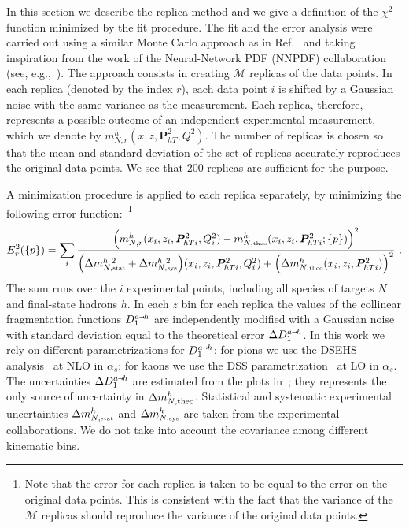 \documentclass[aps,preprintnumbers,showpacs,nofootinbib,superscriptaddress,floatfix]{revtex4}
\newcommand{\smarrow}{\mbox{\raisebox{-4.5pt}[0pt][0pt]{$\hspace{-1pt} 
		\vec{\phantom{v}}$}}}
\newcommand{\Tperp}{T}
\begin{document}
In this section we describe the replica method and we give a definition of the $\chi^2$ function minimized by the fit procedure.
The fit and the error analysis were carried out using a similar Monte Carlo approach as in Ref.~\cite{Bacchetta:2012ty,Signori:2013mda,Radici:2015mwa} and taking
inspiration from the work of the Neural-Network PDF (NNPDF) collaboration (see, e.g.,~\cite{Forte:2002fg,Ball:2008by,Ball:2010de}). 
The approach consists in creating $\mathcal{M}$ replicas of the data points. In each replica (denoted by the index $r$), each data point $i$ is shifted by a Gaussian noise with the same variance as the measurement. 
Each replica, therefore, represents a possible outcome of an independent experimental measurement, which we denote by $m_{N, r}^{h}(x, z, \bm{P}_{h\Tperp}^2, Q^2)$. 
The number of replicas is chosen so that the mean and standard deviation of the set of replicas accurately reproduces the original data points. We see that 200 replicas are sufficient for the purpose.

A minimization procedure is applied to each replica separately, by minimizing the following error function:~\footnote{Note that the error for each replica is taken to be equal to the error on the original data points. This is consistent with the fact that the variance of the $\mathcal{M}$ replicas should reproduce the variance of the original data points.}  
\begin{equation}
E_r^2(\{p\})=\sum_{i} 
\frac{\Bigl(m_{N, r}^{h}(x_i, z_i, \bm{P}_{h\Tperp i}^2, Q_i^2) - m_{N,  \mbox{\tiny theo}}^{h}(x_i, z_i, \bm{P}_{h\Tperp i}^2; \{p\})\Bigr)^2}
        {\Bigl( \Delta m_{N, \mbox{\tiny stat}}^{h\ 2} + \Delta m_{N, \mbox{\tiny sys}}^{h\ 2} \Bigr)(x_i, z_i, \bm{P}_{h\Tperp i}^2, Q^2_i) +\Bigl(\Delta m_{N, \mbox{\tiny theo}}^{h}(x_i, z_i, \bm{P}_{h\Tperp i}^2) \Bigr)^2}\  . 
\label{e:MC_chi2}
\end{equation}
The sum runs over the $i$ experimental points, including all species of targets $N$ and final-state hadrons $h$. 
In each $z$ bin for each replica the values of the collinear fragmentation functions $D_1^{a \smarrow h}$ are independently modified with a Gaussian noise with standard deviation equal to the theoretical error $\Delta D_1^{a\smarrow h}$. 
In this work we rely on different parametrizations for $D_1^{a \smarrow h}$: for pions we use the DSEHS analysis~\cite{deFlorian:2014xna} at NLO in $\alpha_s$; for kaons we use the DSS parametrization~\cite{deFlorian:2007aj} at LO in $\alpha_s$. 
The uncertainties $\Delta D_1^{a\smarrow h}$ are estimated from the plots in~\cite{Epele:2012vg}; they represents the only source of uncertainty in $\Delta m_{N,  {\rm theo}}^{h}$. 
Statistical and systematic experimental uncertainties $\Delta m_{N, \mbox{\tiny stat}}^{h}$ and $\Delta m_{N, \mbox{\tiny sys}}^{h}$ are taken from the experimental collaborations. 
We do not take into account the covariance among different kinematic bins. 
\end{document}
